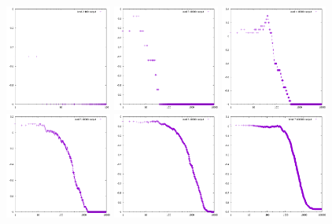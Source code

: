 \documentclass{gshs-report-v1.2}
\begin{document}
\begin{figure}[t]
 	\begin{center}
 		\includegraphics[width=3.5cm]{(a).png}
 		\includegraphics[width=3.5cm]{(b).png}
 		\includegraphics[width=3.5cm]{(c).png}\\
 		\includegraphics[width=3.5cm]{(d).png}
 		\includegraphics[width=3.5cm]{(e).png}
 		\includegraphics[width=3.5cm]{(f).png}

\end{center}
\end{figure}
\end{document}
